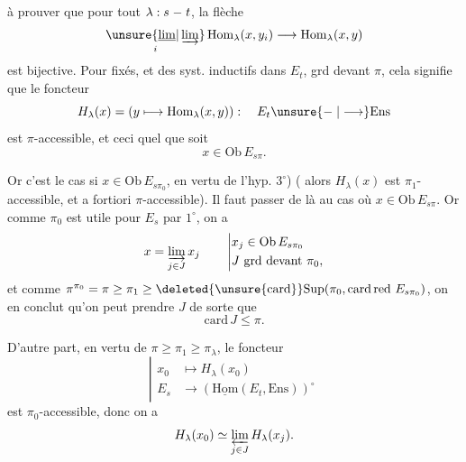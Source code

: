 à prouver que pour tout $\lambda:s\relbar t$, la flèche
\[\underset i{\unsure{\underline{\lim}|\varinjlim}}\,\mathrm{Hom}_{\lambda}(x,y_i)\longrightarrow\mathrm{Hom}_{\lambda}(x,y)\]
est bijective. Pour    fixés, et des syst. inductifs  dans $E_t$, grd devant $\pi$, cela signifie que le foncteur
\[H_\lambda(x)=(y\longmapsto\mathrm{Hom}_\lambda(x,y)):\quad E_t\unsure{\relbar|\longrightarrow}\mathrm{Ens}\]
est $\pi$-accessible, et ceci quel que soit
\[x\in\mathrm{Ob}\,E_{s\pi}.\]

Or c'est le cas si $x\in\mathrm{Ob}\,E_{s\pi_0}$, en vertu de l'hyp. $3^\circ$) ( alors $H_\lambda(x)$ est $\pi_1$-accessible, et a fortiori $\pi$-accessible). Il faut  passer de là au cas où $x\in\mathrm{Ob}\,E_{s\pi}$. Or comme $\pi_0$ est utile pour $E_s$ par $1^\circ$, on a
\[x=\varinjlim_{j\in J}x_j\qquad\left|\begin{aligned}&x_j\in\mathrm{Ob}\,E_{s\pi_0}\\&J\ \text{grd devant }\pi_0,\end{aligned}\right.\]
et comme   $\pi^{\pi_0}=\pi\geq\pi_1\geq\deleted{\unsure{\mathrm{card}}}\mathrm{Sup}(\pi_0,\mathrm{card\,red}\ E_{s\pi_0})$, on en conclut qu'on peut prendre $J$ de sorte que
\[\mathrm{card}\,J\leq\pi.\]

D'autre part, en vertu de $\pi\geq\pi_1\geq\pi_\lambda$, le foncteur
\[\left|\begin{aligned}x_0&\longmapsto H_\lambda(x_0)\\ E_s&\longrightarrow(\underline{\mathrm{Hom}}(E_t,\mathrm{Ens}))^\circ\end{aligned}\right.\]
est $\pi_0$-accessible, donc on a
\[H_\lambda(x_0)\simeq\varprojlim_{j\in J}H_\lambda(x_j).\]

